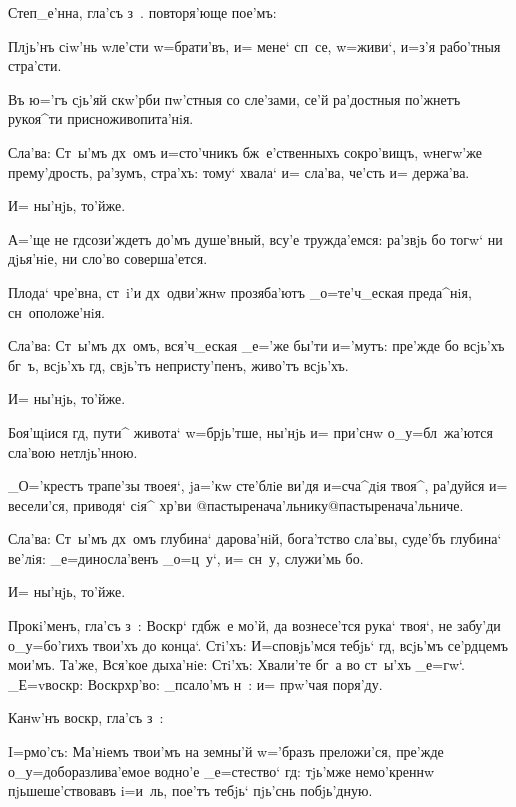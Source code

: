 Степ_е'нна, гла'съ з~. %
повторя'юще пое'мъ:

Плjь'нъ сiw'нь w\т ле'сти w=брати'въ, и= мене` сп~се, 
w=живи`, и=з'я рабо'тныя стра'сти.

Въ ю='гъ сjь'яй скw'рби пw'стныя со сле'зами, се'й 
ра'достныя по'жнетъ рукоя^ти присноживопита'нiя.

Сла'ва: Ст~ы'мъ дх~омъ и=сто'чникъ бж~е'ственныхъ 
сокро'вищъ, w\т негw'же прему'дрость, ра'зумъ, стра'хъ: 
тому` хвала` и= сла'ва, че'сть и= держа'ва.

И= ны'нjь, то'йже.


А='ще не гд сози'ждетъ до'мъ душе'вный, всу'е 
тружда'емся: ра'звjь бо тогw` ни дjья'нiе, ни сло'во 
соверша'ется.

Плода` чре'вна, ст~i'и дх~одви'жнw прозяба'ютъ 
_о=те'ч_еская преда^нiя, сн~оположе'нiя.

Сла'ва: Ст~ы'мъ дх~омъ, вся'ч_еская _е='же бы'ти 
и='мутъ: пре'жде бо всjь'хъ бг~ъ, всjь'хъ гд, 
свjь'тъ непристу'пенъ, живо'тъ всjь'хъ.

И= ны'нjь, то'йже.


Боя'щiися гд, пути^ живота` w=брjь'тше, ны'нjь и= 
при'снw о_у=бл~жа'ются сла'вою нетлjь'нною.

_О='крестъ трапе'зы твоея`, jа='кw сте'блiе ви'дя 
и=сча^дiя твоя^, ра'дуйся и= весели'ся, приводя` сiя^ 
хр'ви @пастыренача'льнику@{пастыренача'льниче}.

Сла'ва: Ст~ы'мъ дх~омъ глубина` дарова'нiй, бога'тство 
сла'вы, суде'бъ глубина` ве'лiя: _е=диносла'венъ _о=ц~у`, 
и= сн~у, служи'мь бо.

И= ны'нjь, то'йже.

Прокi'менъ, гла'съ з~: Воскр` гд бж~е мо'й, да 
вознесе'тся рука` твоя`, не забу'ди о_у=бо'гихъ твои'хъ 
до конца`. Стi'хъ: И=сповjь'мся тебjь` гд, всjь'мъ 
се'рдцемъ мои'мъ. Та'же, Вся'кое дыха'нiе: Стi'хъ: 
Хвали'те бг~а во ст~ы'хъ _е=гw`. _Е=v воскр: 
Воскр хр'во: _псало'мъ н~: и= прw'чая поря'ду.

Канw'нъ воскр, гла'съ з~:


I=рмо'съ: Ма'нiемъ твои'мъ на земны'й w='бразъ 
преложи'ся, пре'жде о_у=доборазлива'емое водно'е 
_е=стество` гд: тjь'мже немо'креннw пjьшеше'ствовавъ 
i=и~ль, пое'тъ тебjь` пjь'снь побjь'дную.

